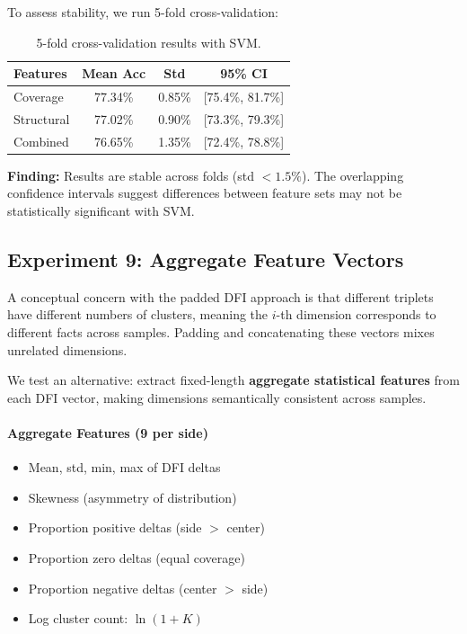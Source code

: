 \documentclass[11pt]{article}
\begin{document}
To assess stability, we run 5-fold cross-validation:

\begin{table}[h]
\centering
\small
\begin{tabular}{lccc}
\toprule
\textbf{Features} & \textbf{Mean Acc} & \textbf{Std} & \textbf{95\% CI} \\
\midrule
Coverage & 77.34\% & 0.85\% & [75.4\%, 81.7\%] \\
Structural & 77.02\% & 0.90\% & [73.3\%, 79.3\%] \\
Combined & 76.65\% & 1.35\% & [72.4\%, 78.8\%] \\
\bottomrule
\end{tabular}
\caption{5-fold cross-validation results with SVM.}
\label{tab:cv}
\end{table}

\textbf{Finding:} Results are stable across folds (std $<1.5\%$). The overlapping confidence intervals suggest differences between feature sets may not be statistically significant with SVM.

\subsection{Experiment 9: Aggregate Feature Vectors}

A conceptual concern with the padded DFI approach is that different triplets have different numbers of clusters, meaning the $i$-th dimension corresponds to different facts across samples. Padding and concatenating these vectors mixes unrelated dimensions.

We test an alternative: extract fixed-length \textbf{aggregate statistical features} from each DFI vector, making dimensions semantically consistent across samples.

\paragraph{Aggregate Features (9 per side)}
\begin{itemize}
    \item Mean, std, min, max of DFI deltas
    \item Skewness (asymmetry of distribution)
    \item Proportion positive deltas (side $>$ center)
    \item Proportion zero deltas (equal coverage)
    \item Proportion negative deltas (center $>$ side)
    \item Log cluster count: $\ln(1 + K)$
\end{itemize}
\end{document}
